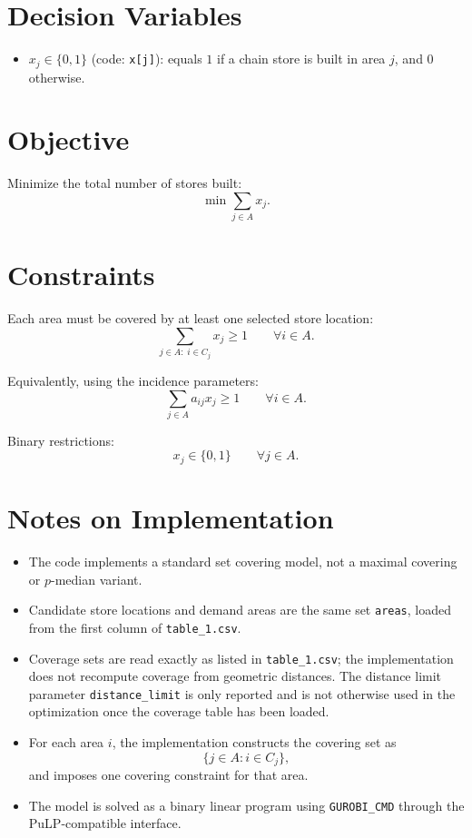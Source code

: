 \section*{Decision Variables}

\begin{itemize}
    \item $x_j \in \{0,1\}$ (code: \texttt{x[j]}): equals $1$ if a chain store is built in area $j$, and $0$ otherwise.
\end{itemize}

\section*{Objective}

Minimize the total number of stores built:
\[
\min \sum_{j \in A} x_j.
\]

\section*{Constraints}

Each area must be covered by at least one selected store location:
\[
\sum_{j \in A:\; i \in C_j} x_j \ge 1
\qquad \forall i \in A.
\]

Equivalently, using the incidence parameters:
\[
\sum_{j \in A} a_{ij} x_j \ge 1
\qquad \forall i \in A.
\]

Binary restrictions:
\[
x_j \in \{0,1\}
\qquad \forall j \in A.
\]

\section*{Notes on Implementation}

\begin{itemize}
    \item The code implements a standard set covering model, not a maximal covering or $p$-median variant.
    \item Candidate store locations and demand areas are the same set \texttt{areas}, loaded from the first column of \texttt{table\_1.csv}.
    \item Coverage sets are read exactly as listed in \texttt{table\_1.csv}; the implementation does not recompute coverage from geometric distances. The distance limit parameter \texttt{distance\_limit} is only reported and is not otherwise used in the optimization once the coverage table has been loaded.
    \item For each area $i$, the implementation constructs the covering set as
    \[
    \{j \in A : i \in C_j\},
    \]
    and imposes one covering constraint for that area.
    \item The model is solved as a binary linear program using \texttt{GUROBI\_CMD} through the PuLP-compatible interface.
\end{itemize}
